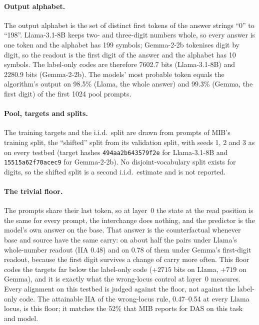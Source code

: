 \documentclass[11pt,a4paper]{article}
\begin{document}
\paragraph{Output alphabet.} The output alphabet is the set of distinct first tokens of the answer strings ``0'' to ``198''. Llama-3.1-8B keeps two- and three-digit numbers whole, so every answer is one token and the alphabet has 199 symbols; Gemma-2-2b tokenises digit by digit, so the readout is the first digit of the answer and the alphabet has 10 symbols. The label-only codes are therefore 7602.7 bits (Llama-3.1-8B) and 2280.9 bits (Gemma-2-2b). The models' most probable token equals the algorithm's output on 98.5\% (Llama, the whole answer) and 99.3\% (Gemma, the first digit) of the first 1024 pool prompts.

\paragraph{Pool, targets and splits.} The training targets and the i.i.d.\ split are drawn from prompts of MIB's training split, the ``shifted'' split from its validation split, with seeds 1, 2 and 3 as on every testbed (target hashes \texttt{494aa2b643579f2e} for Llama-3.1-8B and \texttt{15515a62f70acec9} for Gemma-2-2b). No disjoint-vocabulary split exists for digits, so the shifted split is a second i.i.d.\ estimate and is not reported.

\paragraph{The trivial floor.} The prompts share their last token, so at layer~0 the state at the read position is the same for every prompt, the interchange does nothing, and the predictor is the model's own answer on the base. That answer is the counterfactual whenever base and source have the same carry: on about half the pairs under Llama's whole-number readout (IIA 0.48) and on 0.78 of them under Gemma's first-digit readout, because the first digit survives a change of carry more often. This floor codes the targets far below the label-only code ($+2715$ bits on Llama, $+719$ on Gemma), and it is exactly what the wrong-locus control at layer~0 measures. Every alignment on this testbed is judged against the floor, not against the label-only code. The attainable IIA of the wrong-locus rule, 0.47--0.54 at every Llama locus, is this floor; it matches the 52\% that MIB reports for DAS on this task and model.
\end{document}
